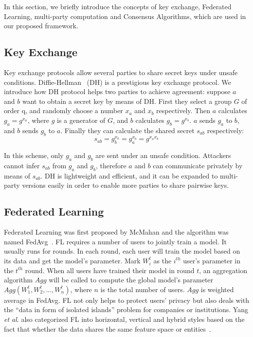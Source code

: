 In this section, we briefly introduce the concepts of key exchange, Federated Learning, multi-party computation and Consensus Algorithms, which are used in our proposed framework.

\subsection{Key Exchange}
Key exchange protocols allow several parties to share secret keys under unsafe conditions. Diffie-Hellman~\cite{DH} (DH) is a prestigious key exchange protocol. We introduce how DH protocol helps two parties to achieve agreement: suppose $a$ and $b$ want to obtain a secret key by means of DH. First they select a group $G$ of order q, and randomly choose a number $x_a$ and $x_b$ respectively. Then $a$ calculates $g_a = g^{x_a}$, where $g$ is a generator of $G$, and $b$ calculates $g_b = g^{x_b}$. $a$ sends $g_a$ to $b$, and $b$ sends $g_b$ to $a$. Finally they can calculate the shared secret $s_{ab}$ respectively:
$$ s_{ab} = g_b^{x_a}  = g_a^{x_b} = g^{x_ax_b}$$

In this scheme, only $g_a$ and $g_b$ are sent under an unsafe condition. Attackers cannot infer $s_{ab}$ from $g_a$ and $g_b$, therefore $a$ and $b$ can communicate privately by means of $s_{ab}$. DH is lightweight and efficient, and it can be expanded to multi-party versions easily in order to enable more parties to share pairwise keys.


\subsection{Federated Learning}
Federated Learning was first proposed by McMahan and the algorithm was named FedAvg~\cite{mcmahan2016communicationefficient}. FL requires a number of users to jointly train a model. It usually runs for rounds. In each round, each user will train the model based on its data and get the model's parameter. Mark $W_i^t$ as the $i^{th}$ user's parameter in the $t^{th}$ round. When all users have trained their model in round $t$, an aggregation algorithm $Agg$ will be called to compute the global model's parameter $Agg(W_1^t, W_2^t, ..., W_n^t)$, where $n$ is the total number of users. $Agg$ is weighted average in FedAvg. FL not only helps to protect users' privacy but also deals with the ``data in form of isolated islands'' problem for companies or institutions. Yang \emph{et al}. also categorized FL into horizontal, vertical and hybrid styles based on the fact that whether the data shares the same feature space or entities~\cite{yang2019federated}. 

